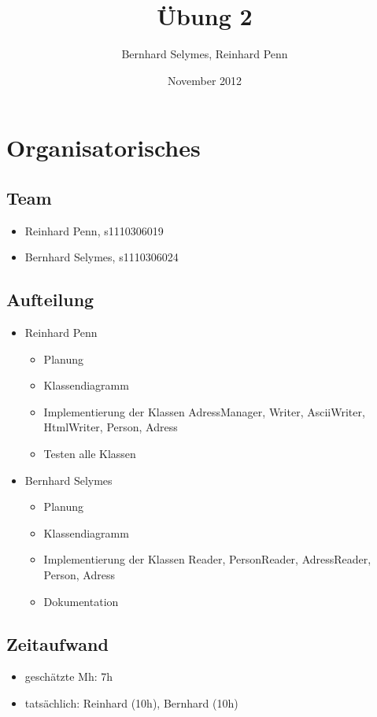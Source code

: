 \documentclass[12pt,a4paper]{article}
\begin{document}
\title{Übung 2}
\author{Bernhard Selymes, Reinhard Penn}
\date{November 2012}

\normalsize

\newcommand{\CodePath}{../AdressManagment/AdressManagement/}

\section{Organisatorisches}

\subsection{Team}
	\begin {itemize} 
		\item Reinhard Penn, s1110306019 
		\item Bernhard Selymes, s1110306024
	\end {itemize}

\subsection{Aufteilung}
	\begin {itemize} 
		\item Reinhard Penn
			\begin {itemize}
				\item Planung
				\item Klassendiagramm
				\item Implementierung der Klassen AdressManager, Writer, AsciiWriter, HtmlWriter, Person, Adress
				\item Testen alle Klassen
			\end {itemize}
		\item Bernhard Selymes
			\begin {itemize}
				\item Planung
				\item Klassendiagramm
				\item Implementierung der Klassen Reader, PersonReader, AdressReader, Person, Adress
				\item Dokumentation				
			\end {itemize}
	\end {itemize}


\subsection{Zeitaufwand}
	\begin {itemize}
		\item geschätzte Mh: 7h
		\item tatsächlich: Reinhard (10h), Bernhard  (10h)
	\end {itemize}
\end{document}
